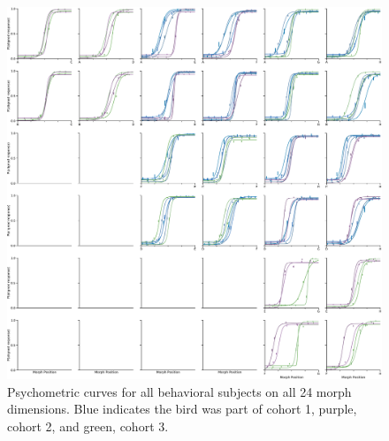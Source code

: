 \begin{figure}[tbp] 
  \centering
  \includegraphics[width=\textwidth]{figures/supplemental/sfig02-psyc-all.pdf}
  \caption[All psychometric curves]
{Psychometric curves for all behavioral subjects on all 24 morph dimensions. Blue indicates the bird was part of cohort 1, purple, cohort 2, and green, cohort 3.
}
  \label{fig:psychometric-all}
\end{figure}